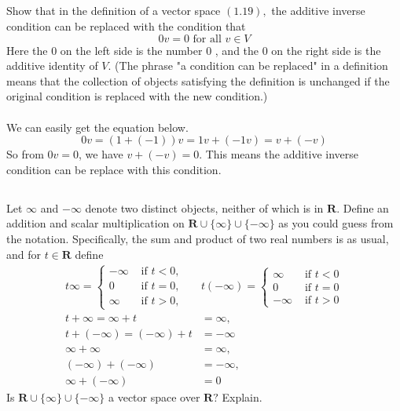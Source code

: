 \documentclass[a4paper]{article}
\begin{document}
\subsection{}
Show that in the definition of a vector space $(1.19),$ the additive inverse condition can be replaced with the condition that
\[
    0 v=0 \text { for all } v \in V
\]
Here the 0 on the left side is the number 0 , and the 0 on the right side is the additive identity of $V$. (The phrase "a condition can be replaced" in a definition means that the collection of objects satisfying the definition is unchanged if the original condition is replaced with the new condition.)
\paragraph{}
We can easily get the equation below.
\[
    0v = (1 + (-1))v = 1v + (-1v) = v + (-v)
\]
So from $0v = 0$, we have $v + (-v) = 0$. This means the additive inverse condition
can be replace with this condition.

\subsection{}
Let $\infty$ and $-\infty$ denote two distinct objects, neither of which is in $\mathbf{R}$. Define an addition and scalar multiplication on $\mathbf{R} \cup\{\infty\} \cup\{-\infty\}$ as you could guess from the notation. Specifically, the sum and product of two real numbers is as usual, and for $t \in \mathbf{R}$ define
\[
    \begin{aligned}
        t \infty=\left\{\begin{array}{ll}
            -\infty & \text { if } t<0, \\
            0       & \text { if } t=0, \\
            \infty  & \text { if } t>0,
        \end{array}\right. & t(-\infty)=\left\{\begin{array}{ll}
            \infty  & \text { if } t<0 \\
            0       & \text { if } t=0 \\
            -\infty & \text { if } t>0
        \end{array}\right. \\
        t+\infty=\infty+t                                 & =\infty,                                            \\
        t+(-\infty)=(-\infty)+t                           & =-\infty                                            \\
        \infty+\infty                                     & =\infty,                                            \\
        (-\infty)+(-\infty)                               & =-\infty,                                           \\
        \infty+(-\infty)                                  & =0
    \end{aligned}
\]
Is $\mathbf{R} \cup\{\infty\} \cup\{-\infty\}$ a vector space over $\mathbf{R} ?$ Explain.
\end{document}
